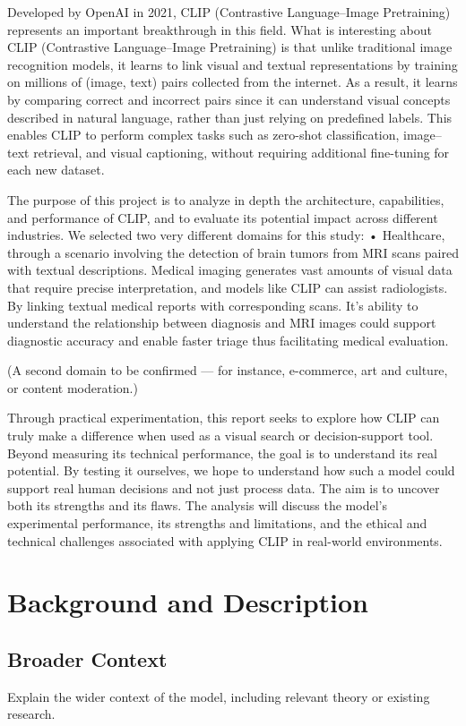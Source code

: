 \documentclass[12pt]{article}
\begin{document}
Developed by OpenAI in 2021, CLIP (Contrastive Language–Image Pretraining) represents an important breakthrough in this field. What is interesting about CLIP (Contrastive Language–Image Pretraining) is that unlike traditional image recognition models, it learns to link visual and textual representations by training on millions of (image, text) pairs collected from the internet. As a result, it learns by comparing correct and incorrect pairs since it can understand visual concepts described in natural language, rather than just relying on predefined labels. This enables CLIP to perform complex tasks such as zero-shot classification, image–text retrieval, and visual captioning, without requiring additional fine-tuning for each new dataset.

The purpose of this project is to analyze in depth the architecture, capabilities, and performance of CLIP, and to evaluate its potential impact across different industries. We selected two very different domains for this study:
•	Healthcare, through a scenario involving the detection of brain tumors from MRI scans paired with textual descriptions. Medical imaging generates vast amounts of visual data that require precise interpretation, and models like CLIP can assist radiologists. By linking textual medical reports with corresponding scans. It’s ability to understand the relationship between diagnosis and MRI images could support diagnostic accuracy and enable faster triage thus facilitating medical evaluation.

(A second domain to be confirmed — for instance, e-commerce, art and culture, or content moderation.)

Through practical experimentation, this report seeks to explore how CLIP can truly make a difference when used as a visual search or decision-support tool. Beyond measuring its technical performance, the goal is to understand its real potential. By testing it ourselves, we hope to understand how such a model could support real human decisions and not just process data. The aim is to uncover both its strengths and its flaws. The analysis will discuss the model’s experimental performance, its strengths and limitations, and the ethical and technical challenges associated with applying CLIP in real-world environments.

\section{Background and Description}

\subsection{Broader Context}
Explain the wider context of the model, including relevant theory or existing research.
\end{document}
